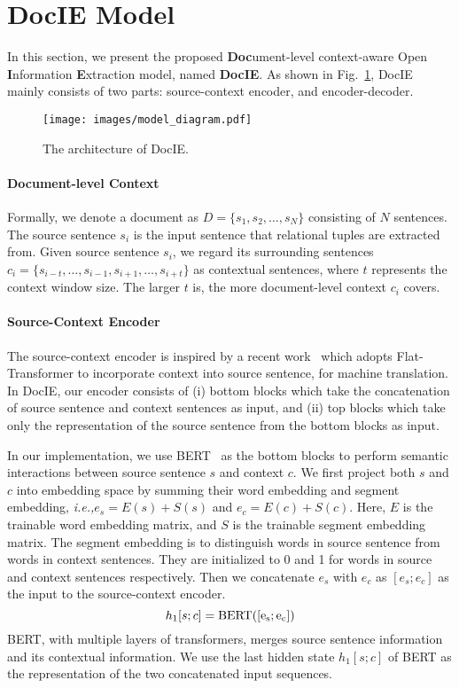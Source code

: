 \documentclass[11pt,a4paper]{article}
\newcommand{\ie}{\emph{i.e.,}\xspace}
\newcommand{\mname}{DocIE\xspace}
\begin{document}
\section{\mname Model}


In this section, we present the proposed \textbf{Doc}ument-level context-aware Open \textbf{I}nformation \textbf{E}xtraction model, named \textbf{\mname}. As shown in Fig.~\ref{fig:DUCE-IE}, \mname mainly consists of two parts: source-context encoder, and encoder-decoder.

\begin{figure}
    \centering
    \texttt{[image: images/model\_diagram.pdf]}
    \caption{The architecture of \mname.}
    \vspace{-0.5em}
    \label{fig:DUCE-IE}
\end{figure}

\paragraph{Document-level Context} Formally, we denote a document as $D=\{s_1,s_2,\dots,s_N\}$ consisting of $N$ sentences. The source sentence $s_i$ is the input sentence that relational tuples are extracted from. Given source sentence $s_i$, we regard its surrounding sentences $c_i=\{s_{i-t},\dots,s_{i-1},s_{i+1},\dots,s_{i+t}\}$ as contextual sentences, where $t$ represents the context window size. The larger $t$ is, the more document-level context $c_i$ covers.

\paragraph{Source-Context Encoder} The source-context encoder is inspired by a recent work~\cite{ma2020simple} which adopts Flat-Transformer to incorporate context into source sentence, for machine translation. In \mname, our encoder consists of (i) bottom blocks which take the concatenation of source sentence and context sentences as input, and (ii) top blocks which take only the representation of the source sentence from the bottom blocks as input.

In our implementation, we use BERT~\cite{devlin2018bert} as the bottom blocks to perform semantic interactions between source sentence $s$ and context $c$. We first project both $s$ and $c$ into embedding space by summing their word embedding and segment embedding, \ie $e_s=E(s)+S(s)$ and $e_c=E(c)+S(c)$. Here, $E$ is the trainable word embedding matrix, and $S$ is the trainable segment embedding matrix. The segment embedding is to distinguish words in source sentence from words in context sentences. They are initialized to 0 and 1 for words in source and context sentences respectively. Then we concatenate $e_s$ with $e_c$ as $[e_s;e_c]$ as the input to the source-context encoder.
\begin{equation}
    h_1[s;c] = \rm{BERT}([e_s;e_c])
\end{equation}
BERT, with multiple layers of transformers, merges source sentence information and its contextual information. We use the last hidden state $h_1[s;c]$ of BERT as the representation of the two concatenated input sequences.
\end{document}
